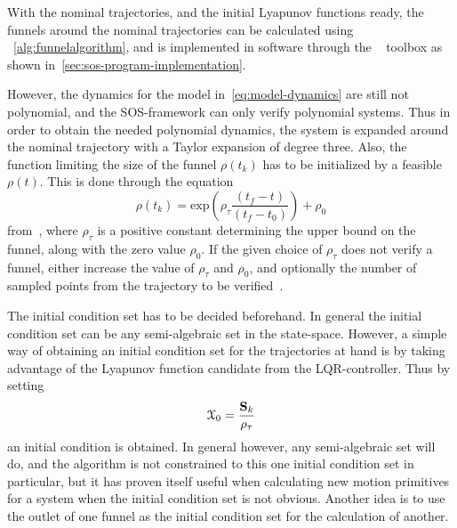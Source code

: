 With the nominal trajectories, and the initial Lyapunov functions ready, the
funnels around the nominal trajectories can be calculated using
~\cref{alg:funnelalgorithm}, and is implemented in software through the
~\cite[sostools]{sostools} toolbox as shown
in~\vref{sec:sos-program-implementation}.

However, the dynamics for the model in~\cref{eq:model-dynamics} are still not
polynomial, and the \ac{SOS}-framework can only verify polynomial systems. Thus
in order to obtain the needed polynomial dynamics, the system is expanded around
the nominal trajectory with a Taylor expansion of degree three. Also, the
function limiting the size of the funnel \(\rho(t_{k})\) has to be initialized
by a feasible \(\rho(t)\). This is done through the equation
\begin{equation}
  \rho(t_{k}) = \mathrm{exp}\left( \rho_{\tau}\frac{\left( t_{f} - t \right)}{\left( t_{f} - t_{0}  \right)}\right) + \rho_0
\end{equation}
from~\cite[eq.~6.sec~3]{Tobenkin_2011}, where \(\rho_{\tau}\) is a positive
constant determining the upper bound on the funnel, along with the zero value
\(\rho_0\). If the given choice of \(\rho_{\tau}\) does not verify a funnel,
either increase the value of \(\rho_{\tau}\) and \(\rho_0\), and optionally the
number of sampled points from the trajectory to be
verified~\cite{Tobenkin_2011}.

The initial condition set has to be decided beforehand. In general the initial
condition set can be any semi-algebraic set in the state-space. However, a
simple way of obtaining an initial condition set for the trajectories at hand is
by taking advantage of the Lyapunov function candidate from the
\ac{LQR}-controller. Thus by setting
\begin{equation}
  \mathcal{X}_{0} = \frac{ \mathbf{S}_{k}}{\rho_{\tau}}
\end{equation}
an initial condition is obtained. In general however, any semi-algebraic set
will do, and the algorithm is not constrained to this one initial condition set
in particular, but it has proven itself useful when calculating new motion
primitives for a system when the initial condition set is not obvious. Another
idea is to use the outlet of one funnel as the initial condition set for the
calculation of another.

